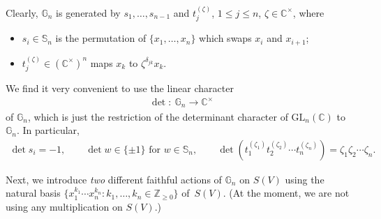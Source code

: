 \documentclass[11pt]{article}
\begin{document}
Clearly, $\mathbb G_n$ is generated by $s_1,\ldots,s_{n-1}$ and $t_j^{(\zeta)}$, $1\le j\le n$, $\zeta\in \mathbb
C^\times$, where
\begin{itemize}\itemsep=0pt
\item
$s_i\in \mathbb S_n$ is the permutation of $\{x_1,\ldots,x_n\}$ which swaps $x_i$ and $x_{i+1}$;
\item
$t_j^{(\zeta)}\in (\mathbb C^\times)^n$ maps $x_k$ to $\zeta^{\delta_{jk}} x_k$.
\end{itemize}
We f\/ind it very convenient to use the linear character
\begin{gather*}
\det \colon \ \mathbb G_n \to \mathbb C^\times
\end{gather*}
of $\mathbb G_n$, which is just the restriction of the determinant character of $\mathrm{GL}_n(\mathbb C)$ to $\mathbb
G_n$.
In particular,
\begin{gather*}
\det s_i = -1,
\qquad
\det w\in\{\pm1\}\text{ for }w\in \mathbb S_n,
\qquad
\det\left(t_1^{(\zeta_1)} t_2^{(\zeta_2)} \cdots t_n^{(\zeta_n)}\right)=\zeta_1\zeta_2\cdots \zeta_n.
\end{gather*}

{\sloppy Next, we introduce \textit{two} dif\/ferent faithful actions of $\mathbb G_n$ on $S(V)$ using the natural basis
$\big\{x_1^{k_1} \cdots x_n^{k_n} :  k_1,\ldots,k_n\in \mathbb Z_{\ge0}\big\}$ of~$S(V)$.
(At the moment, we are not using any multiplication on $S(V)$.)

}
\end{document}
